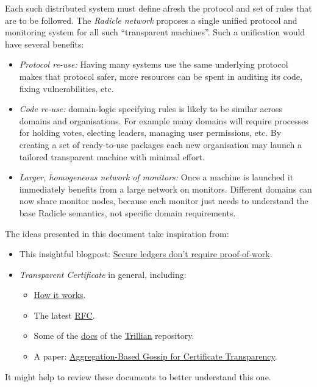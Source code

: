 \documentclass[a4paper, oneside, 10pt]{amsart}
\begin{document}
Each such distributed system must define afresh the protocol and set of rules
that are to be followed. The \emph{Radicle network} proposes a single unified
protocol and monitoring system for all such ``transparent machines''. Such a
unification would have several benefits:
\begin{itemize}
\item \emph{Protocol re-use:} Having many systems use the same underlying
  protocol makes that protocol safer, more resources can be spent in auditing
  its code, fixing vulnerabilities, etc.
\item \emph{Code re-use:} domain-logic specifying rules is likely to be similar
  across domains and organisations. For example many domains will require
  processes for holding votes, electing leaders, managing user permissions,
  etc. By creating a set of ready-to-use packages each new organisation may
  launch a tailored transparent machine with minimal effort.
\item \emph{Larger, homogeneous network of monitors:} Once a machine is launched
  it immediately benefits from a large network on monitors. Different domains
  can now share monitor nodes, because each monitor just needs to understand the
  base Radicle semantics, not specific domain requirements.
\end{itemize}

The ideas presented in this document take inspiration from:
\begin{itemize}
\item This insightful blogpost:
  \href{https://pfrazee.github.io/blog/secure-ledgers-dont-require-proof-of-work}{Secure
    ledgers don't require proof-of-work}.
\item \emph{Transparent Certificate} in general, including:
  \begin{itemize}
  \item \href{https://www.certificate-transparency.org/how-ct-works}{How it
    works}.
  \item The latest
    \href{https://tools.ietf.org/html/draft-ietf-trans-rfc6962-bis-31}{RFC}.
  \item Some of the
    \href{https://github.com/google/trillian/tree/master/docs}{docs} of the
    \href{https://github.com/google/trillian}{Trillian} repository.
  \item A paper: \href{https://arxiv.org/pdf/1806.08817.pdf}{Aggregation-Based
    Gossip for Certificate Transparency}.
  \end{itemize}
\end{itemize}
It might help to review these documents to better understand this one.
\end{document}

